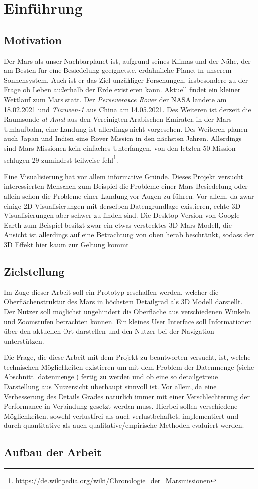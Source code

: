 \chapter{Einführung}

\section{Motivation}
Der Mars als unser Nachbarplanet ist, aufgrund seines Klimas und der Nähe, der am Besten für eine Besiedelung geeignetste, erdähnliche Planet in unserem Sonnensystem. Auch ist er das Ziel unzähliger Forschungen, insbesondere zu der Frage ob Leben außerhalb der Erde existieren kann. Aktuell findet ein kleiner Wettlauf zum Mars statt. Der \textit{Perseverance Rover} der NASA landete am 18.02.2021 und \textit{Tianwen-1} aus China am 14.05.2021. Des Weiteren ist derzeit die Raumsonde \textit{al-Amal} aus den Vereinigten Arabischen Emiraten in der Mars-Umlaufbahn, eine Landung ist allerdings nicht vorgesehen. Des Weiteren planen auch Japan und Indien eine Rover Mission in den nächsten Jahren. Allerdings sind Mars-Missionen kein einfaches Unterfangen, von den letzten 50 Mission schlugen 29 zumindest teilweise fehl\footnote{\url{https://de.wikipedia.org/wiki/Chronologie_der_Marsmissionen}}.

Eine Visualisierung hat vor allem informative Gründe. Dieses Projekt versucht interessierten Menschen zum Beispiel die Probleme einer Mars-Besiedelung oder allein schon die
Probleme einer Landung vor Augen zu führen. Vor allem, da zwar einige 2D Visualisierungen mit derselben Datengrundlage existieren, echte 3D Visualisierungen aber schwer zu finden sind. Die Desktop-Version von Google Earth zum Beispiel besitzt zwar ein etwas verstecktes 3D Mars-Modell, die Ansicht ist allerdings auf eine Betrachtung von oben herab beschränkt, sodass der 3D Effekt hier kaum zur Geltung kommt.

\section{Zielstellung}
Im Zuge dieser Arbeit soll ein Prototyp geschaffen werden, welcher die Oberflächenstruktur des Mars in höchstem Detailgrad als 3D Modell darstellt. Der Nutzer soll möglichst ungehindert die Oberfläche aus verschiedenen Winkeln und Zoomstufen betrachten können. Ein kleines User Interface soll Informationen über den aktuellen Ort darstellen und den Nutzer bei der Navigation unterstützen.

Die Frage, die diese Arbeit mit dem Projekt zu beantworten versucht, ist, welche technischen Möglichkeiten existieren um mit dem Problem der Datenmenge (siehe Abschnitt \ref{datenmenge}) fertig zu werden und ob eine so detailgetreue Darstellung aus Nutzersicht überhaupt sinnvoll ist. Vor allem, da eine Verbesserung des Details Grades natürlich immer mit einer Verschlechterung der Performance in Verbindung gesetzt werden muss. Hierbei sollen verschiedene Möglichkeiten, sowohl verlustfrei als auch verlustbehaftet, implementiert und durch quantitative als auch qualitative/empirische Methoden evaluiert werden.

\section{Aufbau der Arbeit}
